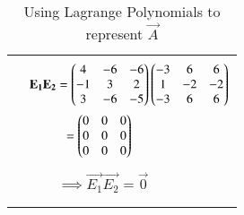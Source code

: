 \begin{longtable}{|c|l|}
	&\\
	&$\mathbf{E_1}\mathbf{E_2}=\begin{pmatrix}4&-6&-6\\-1&3&2\\3&-6&-5\end{pmatrix}\begin{pmatrix}-3&6&6\\1&-2&-2\\-3&6&6\end{pmatrix}$\\
	&$\qquad\quad=\begin{pmatrix}0&0&0\\0&0&0\\0&0&0\end{pmatrix}$\\
	&\\
	&$\qquad\implies\boxed{\vec{E_1}\vec{E_2}=\vec{0}}$\\
	&\\
	\hline
	\caption{Using Lagrange Polynomials to represent $\vec{A}$}
    \label{eq:solutions/6/7/5/table:2}
\end{longtable}
\twocolumn
